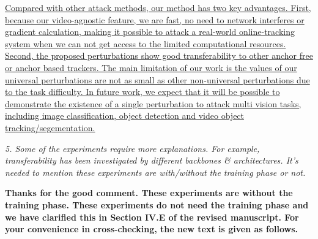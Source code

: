 \documentclass[12pt]{article}
\begin{document}
\uline{
Compared with other attack methods, our method has two key advantages. First,
because our video-agnostic feature, we are fast, no need to network interferes or gradient calculation, making it possible to attack a real-world online-tracking system when we can not get access to the limited computational resources.
Second, the proposed perturbations show good transferability to other anchor free or anchor based trackers. 
The main limitation of our work is the values of our universal perturbations are not as small as other non-universal perturbations due to the task difficulty.
  In future work, we expect that it will be possible to demonstrate the existence of a single perturbation to attack multi vision tasks, including image classification, object detection and video object tracking/segementation.
}

\textit{5. Some of the experiments require more explanations. For example, transferability has been investigated by different backbones \& architectures. It's needed to mention these experiments are with/without the training phase or not.}

\textbf{Thanks for the good comment. These experiments are without the training phase. These experiments do not need the training phase and we have clarified this in Section IV.E of the revised manuscript. For your convenience in cross-checking, the new text is given as follows.}
\end{document}
